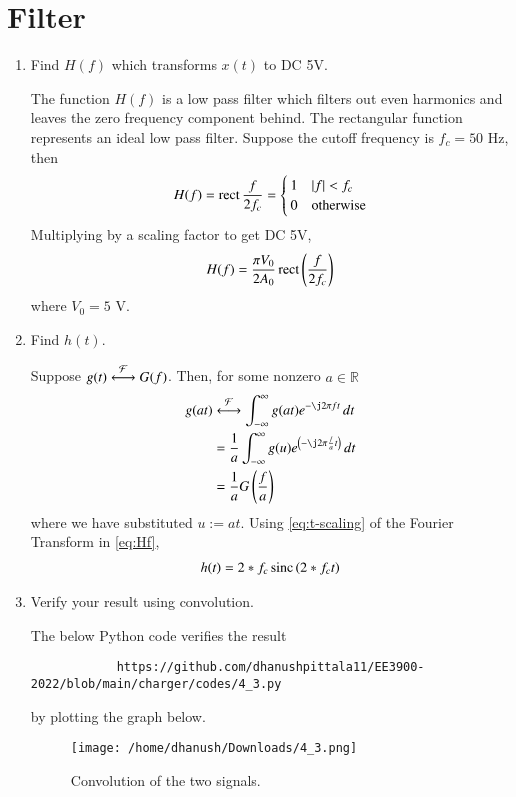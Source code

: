 \documentclass[journal,12pt,twocolumn]{IEEEtran}
\renewcommand\thesection{\arabic{section}}
\begin{document}
	\section{Filter}
	\begin{enumerate}[label=\thesection.\arabic*
		,ref=\thesection.\theenumi]
		\item Find $H(f)$ which transforms $x(t)$ to DC 5V.
		
		\solution The function $H(f)$ is a low pass filter which filters out
		even harmonics and leaves the zero frequency component behind.
		The rectangular function represents an ideal low pass filter. 
		Suppose the cutoff frequency is $f_c = 50$ Hz, then
		\begin{align}
			H(f) = \mathop{\mathrm{rect}}{\frac{f}{2f_c}} =
			\begin{cases}
				1 & \left\vert f\right\vert < f_c \\
				0 & \textrm{otherwise}
			\end{cases}
			\label{eq:Hf}
		\end{align}
		Multiplying by a scaling factor to get DC 5V,
		\begin{align}
			H(f) = \frac{\pi V_0}{2A_0}\mathop{\mathrm{rect}}{\left(\frac{f}{2f_c}\right)}
		\end{align}
		where $V_0 = 5$ V.
		\item Find $h(t)$.
		
		\solution Suppose $g(t)\overset{\mathcal{F}}{ \longleftrightarrow}G(f)$. Then, for some
		nonzero $a \in \mathbb{R}$
		\begin{align}
			g(at)&\system{F}\int_{-\infty}^{\infty}g(at)e^{-\j2\pi ft}\, dt \\
			&=\frac{1}{a}\int_{-\infty}^{\infty}g(u)e^{\brak{-\j2\pi \frac{f}{a}t}}\, dt \\
			&=\frac{1}{a}G\brak{\frac{f}{a}}
			\label{eq:t-scaling}
		\end{align}
		where we have substituted $u := at$. Using 
		\eqref{eq:t-scaling} of the Fourier Transform in \eqref{eq:Hf},
		\begin{align}
			h(t) = 2*f_c\mathop{\mathrm{sinc}}\left(2*f_ct\right)
		\end{align}
		\item Verify your result using convolution.
		
		\solution The below Python code verifies the result
		\begin{lstlisting}
			https://github.com/dhanushpittala11/EE3900-2022/blob/main/charger/codes/4_3.py
		\end{lstlisting}
		by plotting the graph below.
		\begin{figure}[!ht]
			\texttt{[image: /home/dhanush/Downloads/4\_3.png]}
			\caption{Convolution of the two signals.}
			\label{eq:fig-conv}
		\end{figure}
	\end{enumerate}
\end{document}
